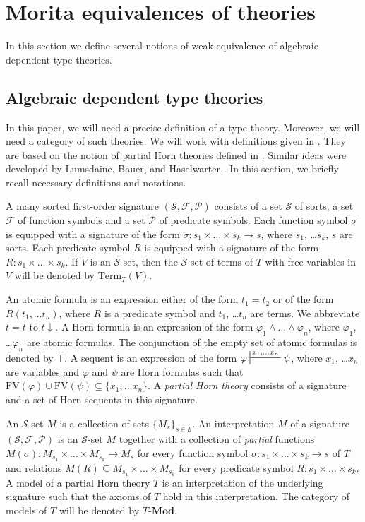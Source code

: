 \documentclass[reqno]{amsart}
\theoremstyle{definition}
\theoremstyle{remark}
\newcommand{\cat}[1]{\mathbf{#1}}
\newcommand{\Mod}[1]{#1\text{-}\cat{Mod}}
\newcommand{\Term}{\mathrm{Term}}
\newcommand{\FV}{\mathrm{FV}}
\numberwithin{figure}{section}
\begin{document}
\section{Morita equivalences of theories}
\label{sec:morita}

In this section we define several notions of weak equivalence of algebraic dependent type theories.

\subsection{Algebraic dependent type theories}

In this paper, we will need a precise definition of a type theory.
Moreover, we will need a category of such theories.
We will work with definitions given in \cite{alg-tt}.
They are based on the notion of partial Horn theories defined in \cite{PHL}.
Similar ideas were developed by Lumsdaine, Bauer, and Haselwarter \cite{lum-tt}.
In this section, we briefly recall necessary definitions and notations.

A many sorted first-order signature $(\mathcal{S},\mathcal{F},\mathcal{P})$ consists of a set $\mathcal{S}$ of sorts,
a set $\mathcal{F}$ of function symbols and a set $\mathcal{P}$ of predicate symbols.
Each function symbol $\sigma$ is equipped with a signature of the form $\sigma : s_1 \times \ldots \times s_k \to s$, where $s_1$, \ldots $s_k$, $s$ are sorts.
Each predicate symbol $R$ is equipped with a signature of the form $R : s_1 \times \ldots \times s_k$.
If $V$ is an $\mathcal{S}$-set, then the $\mathcal{S}$-set of terms of $T$ with free variables in $V$ will be denoted by $\Term_T(V)$.

An atomic formula is an expression either of the form $t_1 = t_2$ or of the form $R(t_1, \ldots t_n)$,
where $R$ is a predicate symbol and $t_1$, \ldots $t_n$ are terms.
We abbreviate $t = t$ to $t\!\downarrow$.
A Horn formula is an expression of the form $\varphi_1 \land \ldots \land \varphi_n$, where $\varphi_1$, \ldots $\varphi_n$ are atomic formulas.
The conjunction of the empty set of atomic formulas is denoted by $\top$.
A sequent is an expression of the form $\varphi \sststile{}{x_1, \ldots x_n} \psi$, where $x_1$, \ldots $x_n$ are variables
and $\varphi$ and $\psi$ are Horn formulas such that $\FV(\varphi) \cup \FV(\psi) \subseteq \{ x_1, \ldots x_n \}$.
A \emph{partial Horn theory} consists of a signature and a set of Horn sequents in this signature.

An $\mathcal{S}$-set $M$ is a collection of sets $\{ M_s \}_{s \in \mathcal{S}}$.
An interpretation $M$ of a signature $(\mathcal{S},\mathcal{F},\mathcal{P})$ is an $\mathcal{S}$-set $M$
together with a collection of \emph{partial} functions $M(\sigma) : M_{s_1} \times \ldots \times M_{s_k} \to M_s$
for every function symbol $\sigma : s_1 \times \ldots \times s_k \to s$ of $T$
and relations $M(R) \subseteq M_{s_1} \times \ldots \times M_{s_k}$ for every predicate symbol $R : s_1 \times \ldots \times s_k$.
A model of a partial Horn theory $T$ is an interpretation of the underlying signature such that the axioms of $T$ hold in this interpretation.
The category of models of $T$ will be denoted by $\Mod{T}$.
\end{document}
